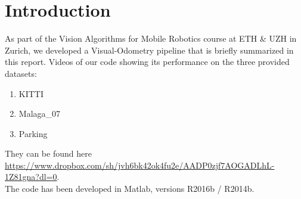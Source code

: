 \section{Introduction}
\label{s:Introduction}

As part of the Vision Algorithms for Mobile Robotics course at ETH \& UZH in Zurich, we developed a Visual-Odometry pipeline that is briefly summarized in this report. Videos of our code showing its performance on the three provided datasets:

\begin{enumerate}
\item KITTI
\item Malaga\_07
\item Parking
\end{enumerate}
 
They can be found here \href{https://www.dropbox.com/sh/jvh6bk42ok4fu2e/AADP0zjf7AOGADLhL-1Z81gna?dl=0}{https://www.dropbox.com/sh/jvh6bk42ok4fu2e/AADP0zjf7AOGADLhL-1Z81gna?dl=0}. \\ The code has been developed in Matlab, versions R2016b / R2014b.

